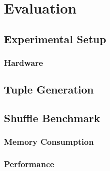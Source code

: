
\chapter{Evaluation}\label{chapter:evaluation}

\section{Experimental Setup}

\subsection{Hardware}

\section{Tuple Generation}

\section{Shuffle Benchmark}

\subsection{Memory Consumption}

\subsection{Performance}
